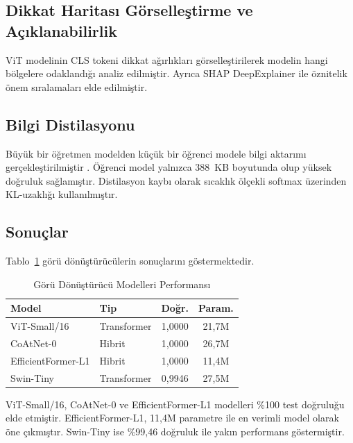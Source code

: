 \documentclass[conference]{IEEEtran}
\begin{document}
\subsection{Dikkat Haritas{\i} G\"{o}rselle\c{s}tirme ve A\c{c}{\i}klanabilirlik}
ViT modelinin CLS tokeni dikkat a\u{g}{\i}rl{\i}klar{\i} g\"{o}rselle\c{s}tirilerek modelin hangi b\"{o}lgelere odakland{\i}\u{g}{\i} analiz edilmi\c{s}tir. Ayr{\i}ca SHAP DeepExplainer \cite{lundberg2017unified} ile \"{o}znitelik \"{o}nem s{\i}ralamalar{\i} elde edilmi\c{s}tir.

\subsection{Bilgi Distilasyonu}
B\"{u}y\"{u}k bir \"{o}\u{g}retmen modelden k\"{u}\c{c}\"{u}k bir \"{o}\u{g}renci modele bilgi aktar{\i}m{\i} ger\c{c}ekle\c{s}tirilmi\c{s}tir \cite{hinton2015distilling}. \"{O}\u{g}renci model yaln{\i}zca 388~KB boyutunda olup y\"{u}ksek do\u{g}ruluk sa\u{g}lam{\i}\c{s}t{\i}r. Distilasyon kayb{\i} olarak s{\i}cakl{\i}k \"{o}l\c{c}ekli softmax \"{u}zerinden KL-uzakl{\i}\u{g}{\i} kullan{\i}lm{\i}\c{s}t{\i}r.

\subsection{Sonu\c{c}lar}
Tablo~\ref{tab:vit} g\"{o}r\"{u} d\"{o}n\"{u}\c{s}t\"{u}r\"{u}c\"{u}lerin sonu\c{c}lar{\i}n{\i} g\"{o}stermektedir.

\begin{table}[htbp]
\centering
\caption{G\"{o}r\"{u} D\"{o}n\"{u}\c{s}t\"{u}r\"{u}c\"{u} Modelleri Performans{\i}}
\label{tab:vit}
\renewcommand{\arraystretch}{1.15}
\begin{tabular}{llcc}
\toprule
\textbf{Model} & \textbf{Tip} & \textbf{Do\u{g}r.} & \textbf{Param.} \\
\midrule
ViT-Small/16        & Transformer & 1,0000 & 21,7M \\
CoAtNet-0           & Hibrit      & 1,0000 & 26,7M \\
EfficientFormer-L1  & Hibrit      & 1,0000 & 11,4M \\
Swin-Tiny           & Transformer & 0,9946 & 27,5M \\
\bottomrule
\end{tabular}
\end{table}

ViT-Small/16, CoAtNet-0 ve EfficientFormer-L1 modelleri \%100 test do\u{g}rulu\u{g}u elde etmi\c{s}tir. EfficientFormer-L1, 11,4M parametre ile en verimli model olarak \"{o}ne \c{c}{\i}km{\i}\c{s}t{\i}r. Swin-Tiny ise \%99,46 do\u{g}ruluk ile yak{\i}n performans g\"{o}stermi\c{s}tir.
\end{document}
